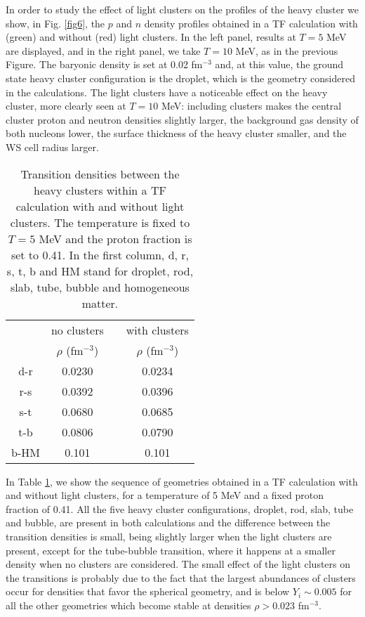 \documentclass[aps,prc,nofootinbib,twocolumn,showpacs]{revtex4-1}
\begin{document}
 In order to study the effect of light clusters on the profiles
  of the heavy cluster we show, in Fig. \ref{fig6}, the $p$ and $n$
  density profiles obtained in a TF calculation with (green) and
  without (red) light clusters. In the left panel, results at $T=5$
  MeV are displayed, and in the right panel, we take $T=10$ MeV, as in
  the previous Figure. The baryonic density is set at 0.02 fm$^{-3}$
  and, at this value, the ground state heavy cluster configuration is
  the droplet, which is the geometry considered in the calculations.  
 The light clusters have a noticeable effect on the heavy cluster,
 more clearly seen at $T=10$ MeV: including clusters makes the central 
cluster  proton and neutron densities  slightly larger,  the background
gas density of both nucleons lower, the surface thickness of the
heavy cluster smaller, and the WS cell radius larger.

  \begin{table}
 \caption{
 Transition densities between the heavy clusters within a TF
 calculation with and without light clusters. The temperature is fixed
 to $T=5$ MeV and the proton fraction is set to 0.41. In the first
 column, d, r, s, t, b and HM stand for droplet, rod, slab, tube, bubble
 and homogeneous matter.} 
 \label{tab1}
   \begin{tabular}{cccc}
    \hline
    \hline
    &	no clusters & \phantom{a} & with clusters \\
     &   $\rho$ (fm$^{-3}$)& \phantom{a} & $\rho$ (fm$^{-3}$)  \\
     \hline
 d-r & 0.0230 & \phantom{a}& 0.0234 \\
 r-s & 0.0392 & \phantom{a}& 0.0396 \\
 s-t & 0.0680 & \phantom{a}& 0.0685 \\
 t-b & 0.0806 & \phantom{a}& 0.0790 \\
 b-HM & 0.101 & \phantom{a}& 0.101 \\
    \hline 
    \hline
  \end{tabular}
 \end{table} 

 In Table \ref{tab1}, we show the sequence of geometries obtained
  in a TF calculation with and without light clusters, for a
  temperature of 5 MeV and a fixed proton fraction of 0.41.  
All the five heavy cluster configurations, droplet, rod, slab, tube
and bubble,  are present in both
  calculations and the difference between the transition densities is
  small, being slightly larger when the light clusters are present,
  except for the tube-bubble transition, where it happens at a smaller
  density when no clusters are considered. 
The small effect of the light clusters on the transitions is
probably due to the fact that the largest abundances of clusters occur
for densities that favor the spherical geometry, and is below $Y_i\sim
0.005$ for all the other geometries which become stable at densities $\rho > 0.023$ fm$^{-3}$.
\end{document}

